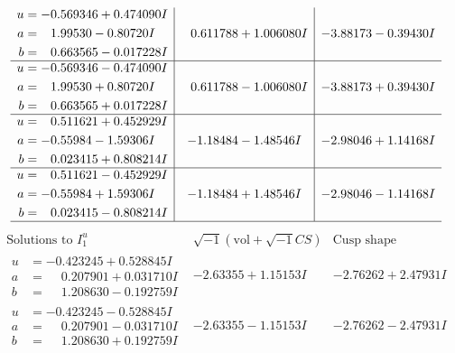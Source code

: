 \documentclass[1p]{elsarticle_modified}
\theoremstyle{definition}
\newcommand{\I}{\sqrt{-1}}
\begin{document}
$$\begin{array}{c|c|c}
\begin{aligned}
u &= -0.569346 + 0.474090 I \\
a &= \phantom{-}1.99530 - 0.80720 I \\
b &= \phantom{-}0.663565 - 0.017228 I\end{aligned}
 & \phantom{-}0.611788 + 1.006080 I & -3.88173 - 0.39430 I \\ \hline\begin{aligned}
u &= -0.569346 - 0.474090 I \\
a &= \phantom{-}1.99530 + 0.80720 I \\
b &= \phantom{-}0.663565 + 0.017228 I\end{aligned}
 & \phantom{-}0.611788 - 1.006080 I & -3.88173 + 0.39430 I \\ \hline\begin{aligned}
u &= \phantom{-}0.511621 + 0.452929 I \\
a &= -0.55984 - 1.59306 I \\
b &= \phantom{-}0.023415 + 0.808214 I\end{aligned}
 & -1.18484 - 1.48546 I & -2.98046 + 1.14168 I \\ \hline\begin{aligned}
u &= \phantom{-}0.511621 - 0.452929 I \\
a &= -0.55984 + 1.59306 I \\
b &= \phantom{-}0.023415 - 0.808214 I\end{aligned}
 & -1.18484 + 1.48546 I & -2.98046 - 1.14168 I\\
 \hline 
 \end{array}$$\newpage$$\begin{array}{c|c|c}  
\text{Solutions to }I^u_{1}& \I (\text{vol} + \sqrt{-1}CS) & \text{Cusp shape}\\
 \hline 
\begin{aligned}
u &= -0.423245 + 0.528845 I \\
a &= \phantom{-}0.207901 + 0.031710 I \\
b &= \phantom{-}1.208630 - 0.192759 I\end{aligned}
 & -2.63355 + 1.15153 I & -2.76262 + 2.47931 I \\ \hline\begin{aligned}
u &= -0.423245 - 0.528845 I \\
a &= \phantom{-}0.207901 - 0.031710 I \\
b &= \phantom{-}1.208630 + 0.192759 I\end{aligned}
 & -2.63355 - 1.15153 I & -2.76262 - 2.47931 I \\ \hline\begin{aligned}

\end{aligned}
\end{array}$$
\end{document}
